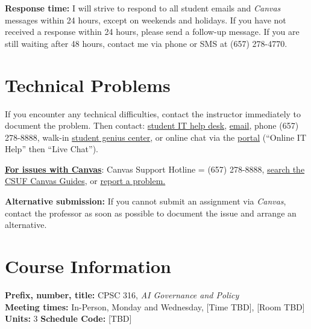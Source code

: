 \documentclass[12pt]{article}
\begin{document}
\vspace{0.5em}
\noindent \textbf{Response time:} I will strive to respond to all student emails and \emph{Canvas} messages within 24 hours, except on weekends and holidays. If you have not received a response within 24 hours, please send a follow-up message. If you are still waiting after 48 hours, contact me via phone or SMS at (657) 278-4770.

\section*{Technical Problems}

If you encounter any technical difficulties, contact the instructor immediately to document the problem. Then contact: \href{http://www.fullerton.edu/it/students/helpdesk/index.php}{student IT help desk}, \href{mailto:StudentITHelpDesk@fullerton.edu}{email}, phone (657) 278-8888, walk-in \href{http://www.fullerton.edu/it/students/sgc/index.php}{student genius center}, or online chat via the \href{http://my.fullerton.edu}{portal} (``Online IT Help'' then ``Live Chat'').

\vspace{0.5em}
\noindent \textbf{\underline{For issues with Canvas}}: Canvas Support Hotline = (657) 278-8888, \href{https://canvashelp.fullerton.edu/}{search the CSUF Canvas Guides}, or \href{https://titans.service-now.com/sp?id=sc_cat_item&sys_id=f88efe80ebea6a10fb7cfcffcad0cdc6&subject=Canvas}{report a problem.}

\vspace{0.5em}
\noindent \textbf{Alternative submission:} If you cannot submit an assignment via \emph{Canvas}, contact the professor as soon as possible to document the issue and arrange an alternative.

\section*{Course Information}
\noindent \textbf{Prefix, number, title:} CPSC 316, \textit{AI Governance and Policy} \\
\noindent \textbf{Meeting times:} In-Person, Monday and Wednesday, [Time TBD], [Room TBD] \\
\noindent \textbf{Units:} 3 \quad \textbf{Schedule Code:} [TBD]
\end{document}
